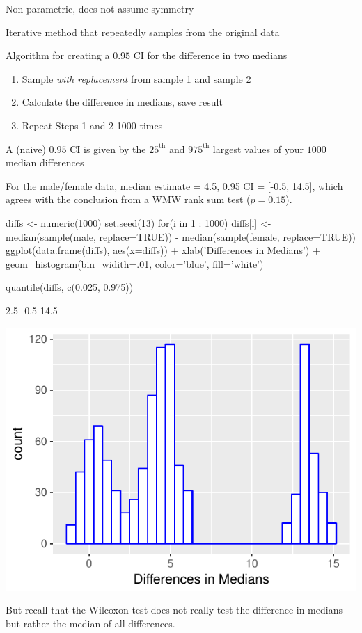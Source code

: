 \item Non-parametric, does not assume symmetry
\item Iterative method that repeatedly samples from the original data
\item Algorithm for creating a $0.95$ CI for the difference in two medians
\begin{enumerate}
\item Sample \textit{with replacement} from sample 1 and sample 2
\item Calculate the difference in medians, save result
\item Repeat Steps 1 and 2 1000 times
\end{enumerate}
\item A (naive) $0.95$ CI is given by the $25^\textrm{th}$ and $975^\textrm{th}$ largest values of your $1000$ median differences
\item For the male/female data, median estimate = 4.5, 0.95 CI = [-0.5, 14.5], which agrees with the conclusion from a WMW rank sum test ($p = 0.15$).
\ei
\ei
\begin{Schunk}
\begin{Sinput}
diffs <- numeric(1000)
set.seed(13)
for(i in 1 : 1000) diffs[i] <-
  median(sample(male, replace=TRUE)) - median(sample(female, replace=TRUE))
ggplot(data.frame(diffs), aes(x=diffs)) + xlab('Differences in Medians') +
  geom_histogram(bin_widith=.01, color='blue', fill='white')
\end{Sinput}
\begin{Sinput}
quantile(diffs, c(0.025, 0.975))
\end{Sinput}
\begin{Soutput}
 2.5%
 -0.5  14.5 
\end{Soutput}


\centerline{\includegraphics[width=\maxwidth]{nonpar-diffmedboot-1} }

\end{Schunk}
But recall that the Wilcoxon test does not really test the difference
in medians but rather the median of all differences.

